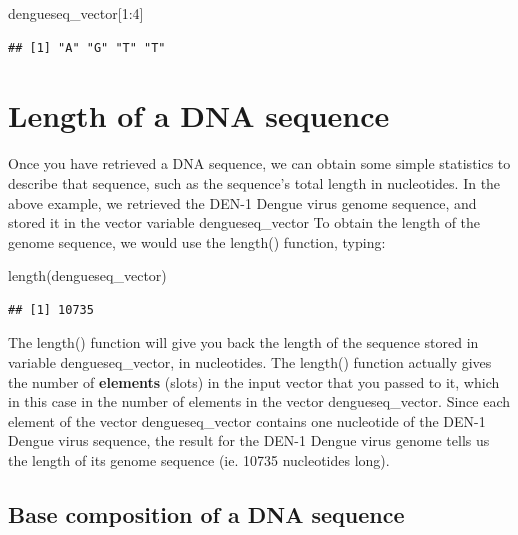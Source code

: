 \documentclass[
]{book}
\newenvironment{Shaded}{\begin{snugshade}}{\end{snugshade}}
\newcommand{\DecValTok}[1]{\textcolor[rgb]{0.00,0.00,0.81}{#1}}
\newcommand{\FunctionTok}[1]{\textcolor[rgb]{0.00,0.00,0.00}{#1}}
\newcommand{\NormalTok}[1]{#1}
\newcommand{\SpecialCharTok}[1]{\textcolor[rgb]{0.00,0.00,0.00}{#1}}
\begin{document}
\begin{Shaded}
\begin{Highlighting}[]
\NormalTok{dengueseq\_vector[}\DecValTok{1}\SpecialCharTok{:}\DecValTok{4}\NormalTok{]}
\end{Highlighting}
\end{Shaded}

\begin{verbatim}
## [1] "A" "G" "T" "T"
\end{verbatim}

\hypertarget{length-of-a-dna-sequence}{%
\section{Length of a DNA sequence}\label{length-of-a-dna-sequence}}

Once you have retrieved a DNA sequence, we can obtain some simple statistics to describe that sequence, such as the sequence's total length in nucleotides. In the above example, we retrieved the DEN-1 Dengue virus genome sequence, and stored it in the vector variable dengueseq\_vector To obtain the length of the genome sequence, we would use the length() function, typing:

\begin{Shaded}
\begin{Highlighting}[]
\FunctionTok{length}\NormalTok{(dengueseq\_vector)}
\end{Highlighting}
\end{Shaded}

\begin{verbatim}
## [1] 10735
\end{verbatim}

The length() function will give you back the length of the sequence stored in variable dengueseq\_vector, in nucleotides. The length() function actually gives the number of \textbf{elements} (slots) in the input vector that you passed to it, which in this case in the number of elements in the vector dengueseq\_vector. Since each element of the vector dengueseq\_vector contains one nucleotide of the DEN-1 Dengue virus sequence, the result for the DEN-1 Dengue virus genome tells us the length of its genome sequence (ie. 10735 nucleotides long).

\hypertarget{base-composition-of-a-dna-sequence}{%
\subsection{Base composition of a DNA sequence}\label{base-composition-of-a-dna-sequence}}
\end{document}

